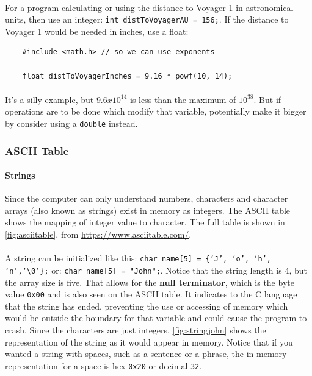 \documentclass[letter,11pt]{article}
\begin{document}
\paragraph{}For a program calculating or using the distance to Voyager 1 in astronomical units, then use an integer: \texttt{int distToVoyagerAU = 156;}. If the distance to Voyager 1 would be needed in inches, use a float: 
\begin{verbatim}
    #include <math.h> // so we can use exponents

    float distToVoyagerInches = 9.16 * powf(10, 14);
\end{verbatim}

\paragraph{}It's a silly example, but $9.6 x 10^{14}$ is less than the maximum of $10^{38}$. But if operations are to be done which modify that variable, potentially make it bigger by consider using a \texttt{double} instead.

\FloatBarrier
\subsubsection{ASCII Table}
\paragraph{Strings}Since the computer can only understand numbers, characters and character \hyperref[sec:arrays]{arrays} (also known as strings) exist in memory as integers. The ASCII table shows the mapping of integer value to character. The full table is shown in \autoref{fig:asciitable}, from \url{https://www.asciitable.com/}.

\paragraph{}A string can be initialized like this: \texttt{char name[5] = \{`J', `o', `h', `n',`\textbackslash0'\};} or: \texttt{char name[5] = "John";}. Notice that the string length is 4, but the array size is five. That allows for the \textbf{null terminator}, which is the byte value \texttt{0x00} and is also seen on the ASCII table. It indicates to the C language that the string has ended, preventing the use or accessing of memory which would be outside the boundary for that variable and could cause the program to crash. Since the characters are just integers, \autoref{fig:stringjohn} shows the representation of the string as it would appear in memory. Notice that if you wanted a string with spaces, such as a sentence or a phrase, the in-memory representation for a space is hex \texttt{0x20} or decimal \texttt{32}.
\end{document}
